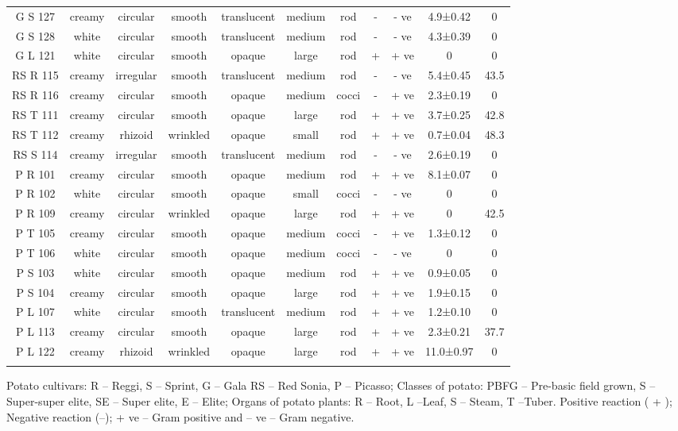 \documentclass[sn-mathphys,Numbered]{sn-jnl}%
\theoremstyle{thmstyleone}%
\theoremstyle{thmstyletwo}%
\theoremstyle{thmstylethree}%
\begin{document}
\begin{table}
\begin{tabular}{@{\extracolsep{5pt}} ccccccccccc}
G S 127 & creamy & circular & smooth & translucent & medium & rod & - & - ve & 4.9±0.42 & 0 \\ 
G S 128 & white & circular & smooth & translucent & medium & rod & - & - ve & 4.3±0.39 & 0 \\ 
G L 121 & white & circular & smooth & opaque & large & rod & + & + ve & 0 & 0 \\ 
RS R 115 & creamy & irregular & smooth & translucent & medium & rod & - & - ve & 5.4±0.45 & 43.5 \\ 
RS R 116 & creamy & circular & smooth & opaque & medium & cocci & - & + ve & 2.3±0.19 & 0 \\ 
RS T 111 & creamy & circular & smooth & opaque & large & rod & + & + ve & 3.7±0.25 & 42.8 \\ 
RS T 112 & creamy & rhizoid & wrinkled & opaque & small & rod & + & + ve & 0.7±0.04 & 48.3 \\ 
RS S 114 & creamy & irregular & smooth & translucent & medium & rod & - & - ve & 2.6±0.19 & 0 \\ 
P R 101 & creamy & circular & smooth & opaque & medium & rod & + & + ve & 8.1±0.07 & 0 \\ 
P R 102 & white & circular & smooth & opaque & small & cocci & - & - ve & 0 & 0 \\ 
P R 109 & creamy & circular & wrinkled & opaque & large & rod & + & + ve & 0 & 42.5 \\ 
P T 105 & creamy & circular & smooth & opaque & medium & cocci & - & + ve & 1.3±0.12 & 0 \\ 
P T 106 & white & circular & smooth & opaque & medium & cocci & - & - ve & 0 & 0 \\ 
P S 103 & white & circular & smooth & opaque & medium & rod & + & + ve & 0.9±0.05 & 0 \\ 
P S 104 & creamy & circular & smooth & opaque & large & rod & + & + ve & 1.9±0.15 & 0 \\ 
P L 107 & white & circular & smooth & translucent & medium & rod & + & + ve & 1.2±0.10 & 0 \\ 
P L 113 & creamy & circular & smooth & opaque & large & rod & + & + ve & 2.3±0.21 & 37.7 \\ 
P L 122 & creamy & rhizoid & wrinkled & opaque & large & rod & + & + ve & 11.0±0.97 & 0 \\ 
\hline \\[-1.8ex] 
\end{tabular} 
Potato cultivars: R – Reggi, S – Sprint, G – Gala RS – Red Sonia, P – Picasso; Classes of potato: PBFG – Pre-basic field grown, S – Super-super elite, SE – Super elite, E – Elite; Organs of potato plants: R – Root, L –Leaf, S – Steam, T –Tuber. Positive reaction ( + ); Negative reaction (–); + ve – Gram positive and – ve – Gram negative.
\end{table} 
\end{document}
